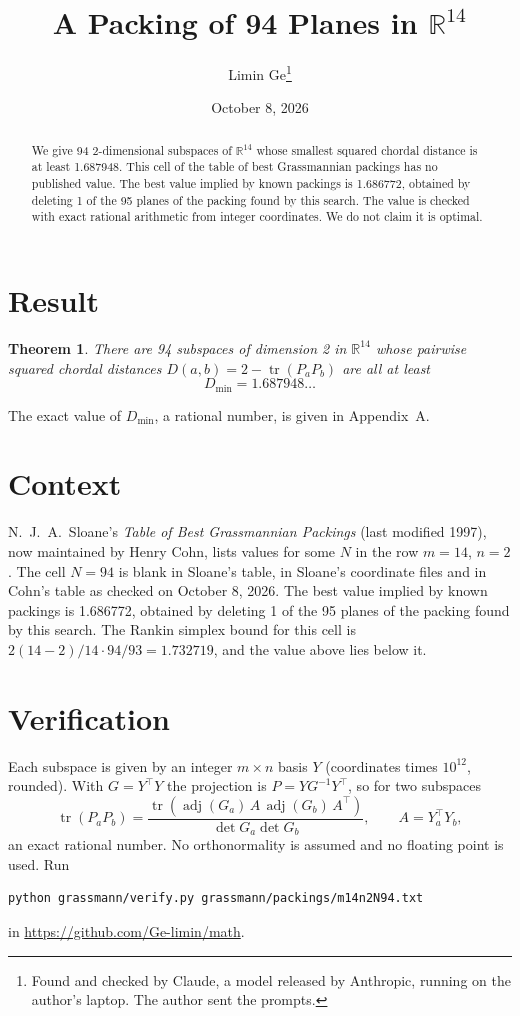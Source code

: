\documentclass[11pt,a4paper]{article}
\title{A Packing of 94 Planes in $\mathbb{R}^{14}$}
\author{Limin Ge\thanks{Found and checked by Claude, a model released by Anthropic, running on the author's laptop. The author sent the prompts.}}
\date{October 8, 2026}
\newtheorem*{theorem}{Theorem}
\begin{document}
\maketitle
\begin{abstract}
We give 94 2-dimensional subspaces of $\mathbb{R}^{14}$ whose smallest squared chordal distance is at least 1.687948. This cell of the table of best Grassmannian packings has no published value. The best value implied by known packings is 1.686772, obtained by deleting 1 of the 95 planes of the packing found by this search. The value is checked with exact rational arithmetic from integer coordinates. We do not claim it is optimal.
\end{abstract}

\section{Result}
\begin{theorem}
There are 94 subspaces of dimension 2 in $\mathbb{R}^{14}$ whose pairwise squared chordal distances $D(a,b) = 2 - \operatorname{tr}(P_aP_b)$ are all at least
\[ D_{\min} = 1.687948\ldots \]
\end{theorem}
The exact value of $D_{\min}$, a rational number, is given in Appendix~A.


\section{Context}
N.~J.~A.~Sloane's \emph{Table of Best Grassmannian Packings} (last modified 1997), now maintained by Henry Cohn, lists values for some $N$ in the row $m=14$, $n=2$. The cell $N=94$ is blank in Sloane's table, in Sloane's coordinate files and in Cohn's table as checked on October 8, 2026. The best value implied by known packings is 1.686772, obtained by deleting 1 of the 95 planes of the packing found by this search. The Rankin simplex bound for this cell is $2(14-2)/14\cdot 94/93 = 1.732719$, and the value above lies below it.


\section{Verification}
Each subspace is given by an integer $m\times n$ basis $Y$ (coordinates times $10^{12}$, rounded). With $G=Y^\top Y$ the projection is $P=YG^{-1}Y^\top$, so for two subspaces
\[ \operatorname{tr}(P_aP_b)=\frac{\operatorname{tr}(\operatorname{adj}(G_a)\,A\,\operatorname{adj}(G_b)\,A^\top)}{\det G_a\det G_b},\qquad A=Y_a^\top Y_b, \]
an exact rational number. No orthonormality is assumed and no floating point is used. Run
\begin{verbatim}
python grassmann/verify.py grassmann/packings/m14n2N94.txt
\end{verbatim}
in \url{https://github.com/Ge-limin/math}.
\end{document}
